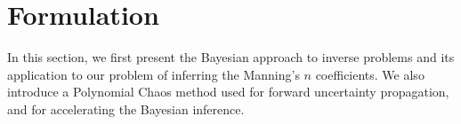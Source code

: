 \section{Formulation}
\label{sec:formu}
In this section, we first present the Bayesian approach to inverse problems 
and its application to our problem of inferring the Manning's $n$ coefficients.
We also introduce
a Polynomial Chaos method used for forward uncertainty propagation, and 
for accelerating the Bayesian inference.





